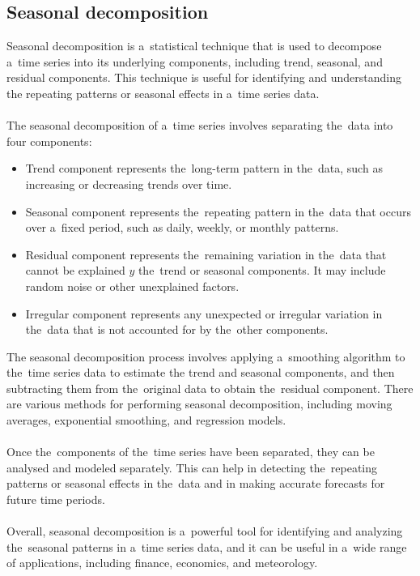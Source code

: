 \subsection{Seasonal decomposition}\label{subsec:seasonal}
Seasonal decomposition is a~statistical technique that is used to decompose a~time series into its underlying components,
including trend, seasonal, and residual components. This technique is useful for identifying and understanding
the repeating patterns or seasonal effects in a~time series data.\\
\\
The seasonal decomposition of a~time series involves separating the~data into four components:
\begin{itemize}
    \item Trend component represents the~long-term pattern in the~data, such as increasing or
    decreasing trends over time.
    \item Seasonal component represents the~repeating pattern in the~data that occurs over a~fixed
    period, such as daily, weekly, or monthly patterns.
    \item Residual component represents the~remaining variation in the~data that cannot be explained
    $y$ the~trend or seasonal components. It may include random noise or other unexplained factors.
    \item Irregular component represents any unexpected or irregular variation in the~data that is not
    accounted for by the~other components.
\end{itemize}
The seasonal decomposition process involves applying a~smoothing algorithm to the~time series data to estimate the
trend and seasonal components, and then subtracting them from the~original data to obtain the~residual component.
There are various methods for performing seasonal decomposition, including moving averages, exponential smoothing,
and regression models.\\
\\
Once the~components of the~time series have been separated, they can be analysed and modeled separately.
This can help in detecting the~repeating patterns or seasonal effects in the~data and in making accurate forecasts for
future time periods.\\
\\
Overall, seasonal decomposition is a~powerful tool for identifying and analyzing the~seasonal patterns in a~time series
data, and it can be useful in a~wide range of applications, including finance, economics, and meteorology.\\

